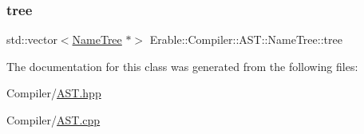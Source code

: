 \mbox{\label{class_erable_1_1_compiler_1_1_a_s_t_1_1_name_tree_aa5535b40b2cac012da11e76e99450959}} 
\subsubsection{\texorpdfstring{tree}{tree}}
{\footnotesize\ttfamily std\+::vector$<$\mbox{\hyperlink{class_erable_1_1_compiler_1_1_a_s_t_1_1_name_tree}{Name\+Tree}} $\ast$$>$ Erable\+::\+Compiler\+::\+A\+S\+T\+::\+Name\+Tree\+::tree\hspace{0.3cm}{\ttfamily [protected]}}



The documentation for this class was generated from the following files\+:\begin{DoxyCompactItemize}
\item 
Compiler/\mbox{\hyperlink{_a_s_t_8hpp}{A\+S\+T.\+hpp}}\item 
Compiler/\mbox{\hyperlink{_a_s_t_8cpp}{A\+S\+T.\+cpp}}\end{DoxyCompactItemize}
